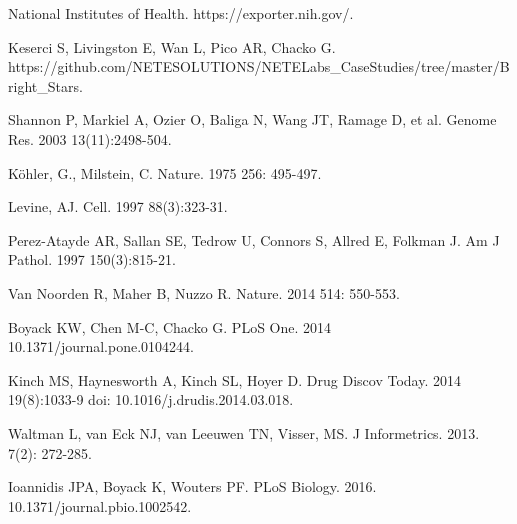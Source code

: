 \documentclass[10pt,letterpaper]{article}
\begin{document}
\begin{thebibliography}{10}
National Institutes of Health.
\newblock https://exporter.nih.gov/.

Keserci S, Livingston E, Wan L, Pico AR, Chacko G.
\newblock https://github.com/NETESOLUTIONS/NETELabs\_CaseStudies/tree/master/Bright\_Stars.

Shannon P, Markiel A, Ozier O, Baliga N, Wang JT, Ramage D, et al.
\newblock Genome Res. 2003 13(11):2498-504.

K\"ohler, G., Milstein, C.
\newblock Nature. 1975 256: 495-497.

Levine, AJ.
\newblock Cell. 1997 88(3):323-31.

Perez-Atayde AR, Sallan SE, Tedrow U, Connors S, Allred E, Folkman J.
\newblock Am J Pathol. 1997 150(3):815-21.

Van Noorden R, Maher B, Nuzzo R.
\newblock Nature. 2014 514: 550-553. 

Boyack KW, Chen M-C, Chacko G. 
\newblock  PLoS One. 2014 10.1371/journal.pone.0104244.

Kinch MS, Haynesworth A, Kinch SL, Hoyer D.
\newblock  Drug Discov Today. 2014 19(8):1033-9 doi: 10.1016/j.drudis.2014.03.018.

Waltman L, van Eck NJ, van Leeuwen TN, Visser, MS.
\newblock  J Informetrics. 2013. 7(2): 272-285.

Ioannidis JPA, Boyack K, Wouters PF.
\newblock  PLoS Biology. 2016. 10.1371/journal.pbio.1002542.

\end{thebibliography}
\end{document}
